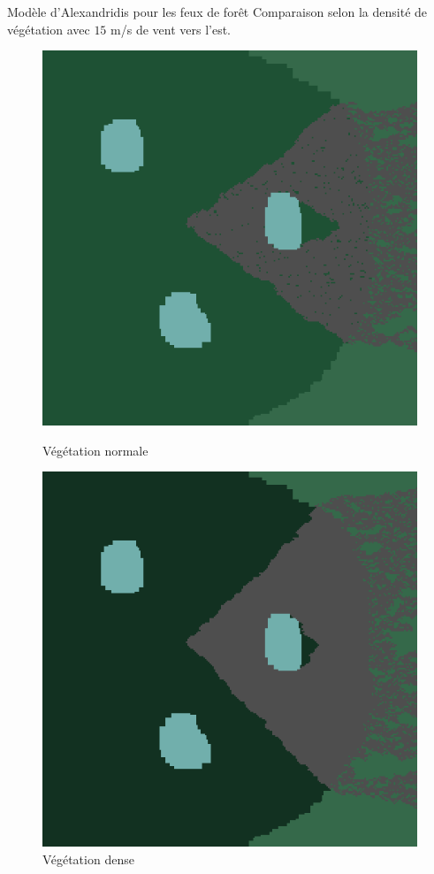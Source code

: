 \documentclass{beamer}
\begin{document}
\begin{frame}{Modèle d'Alexandridis pour les feux de forêt \hyperlink{jump}{\beamerbutton{ }} \hypertarget{11}{\beamerbutton{ }}}
    Comparaison selon la densité de végétation avec $15$ m/s de vent vers l'est.

    \begin{figure}[!htb]
        \begin{minipage}{0.48\textwidth}
          \centering
          \includegraphics[width=.8\linewidth]{pictures/model2/land_200_wind_notdense.png}
          \caption{Végétation normale}\label{Fig:Data1}
        \end{minipage}\hfill
        \begin{minipage}{0.48\textwidth}
          \centering
          \includegraphics[width=.8\linewidth]{pictures/model2/land_200_wind_dense.png}
          \caption{Végétation dense}\label{Fig:Data2}
        \end{minipage}
     \end{figure}
\end{frame}
\end{document}
